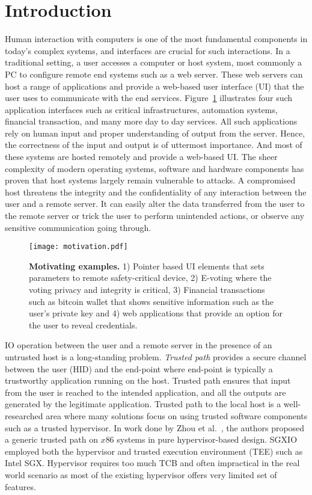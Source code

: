 \section{Introduction}
\label{sec:intro}

Human interaction with computers is one of the most fundamental components in today's complex systems, and interfaces are crucial for such interactions. In a traditional setting, a user accesses a computer or host system, most commonly a PC to configure remote end systems such as a web server. These web servers can host a range of applications and provide a web-based user interface (UI) that the user uses to communicate with the end services. Figure~\ref{fig:motivation} illustrates four such application interfaces such as critical infrastructures, automation systems, financial transaction, and many more day to day services. All such applications rely on human input and proper understanding of output from the server. Hence, the correctness of the input and output is of uttermost importance. And most of these systems are hosted remotely and provide a web-based UI. The sheer complexity of modern operating systems, software and hardware components has proven that host systems largely remain vulnerable to attacks. A compromised host threatens the integrity and the confidentiality of any interaction between the user and a remote server. It can easily alter the data transferred from the user to the remote server or trick the user to perform unintended actions, or observe any sensitive communication going through.

\begin{figure}[t]
\centering
\texttt{[image: motivation.pdf]}
\caption{\textbf{Motivating examples.} 1) Pointer based UI elements that sets parameters to remote safety-critical device, 2) E-voting where the voting privacy and integrity is critical, 3) Financial transactions such as bitcoin wallet that shows sensitive information such as the user's private key and 4) web applications that provide an option for the user to reveal credentials.}
\spacesave
\label{fig:motivation}
\centering
\end{figure}


IO operation between the user and a remote server in the presence of an untrusted host is a long-standing problem. \emph{Trusted path} provides a secure channel between the user (HID) and the end-point where end-point is typically a trustworthy application running on the host. Trusted path ensures that input from the user is reached to the intended application, and all the outputs are generated by the legitimate application. Trusted path to the local host is a well-researched area where many solutions focus on using trusted software components such as a trusted hypervisor. In work done by Zhou et al.~\cite{zhou2012building}, the authors proposed a generic trusted path on $x86$ systems in pure hypervisor-based design. SGXIO~\cite{weiser2017sgxio} employed both the hypervisor and trusted execution environment (TEE) such as Intel SGX. Hypervisor requires too much TCB and often impractical in the real world scenario as most of the existing hypervisor offers very limited set of features.


